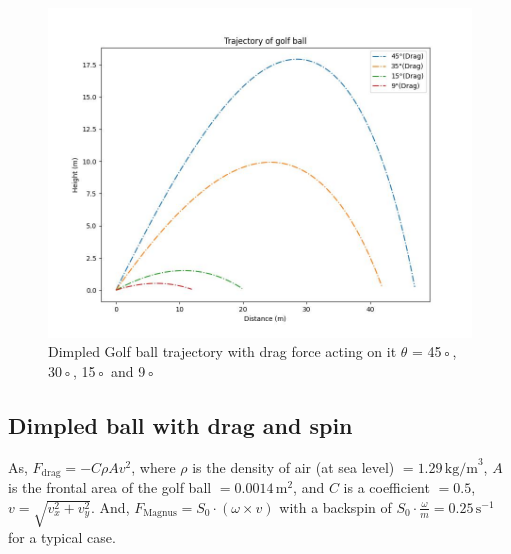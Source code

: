 \documentclass[11pt]{article}
\begin{document}
\begin{justify}
\begin{figure}[b]
    \centering
    \includegraphics[width=\textwidth, height=\textheight, keepaspectratio]{Golf_Trajectory_Smooth_Drag.jpeg}
    \caption{Dimpled Golf ball trajectory with drag force acting on it $\theta$ = 45◦, 30◦, 15◦ and 9◦}
    \label{fig:Dimpled_Fdrag_trajectory}
\end{figure}

\subsection{Dimpled ball with drag and spin}

As, \(F_{\text{drag}} = -C\rho Av^2\), where \(\rho\) is the density of air (at sea level) \(= 1.29 \, \text{kg/m}^3\), \(A\) is the frontal area of the golf ball \(= 0.0014 \, \text{m}^2\), and \(C\) is a coefficient \(= 0.5\), \(v = \sqrt{v_x^2 + v_y^2}\).
And, \(F_{\text{Magnus}} = S_0 \cdot (\omega \times v)\) with a backspin of \(S_0 \cdot \frac{\omega}{m} = 0.25 \, \text{s}^{-1}\) for a typical case.


\end{justify}
\end{document}
